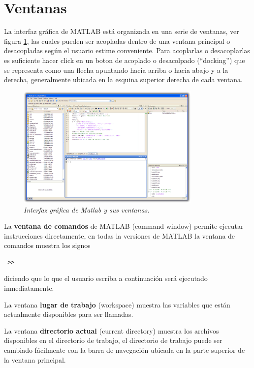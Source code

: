 \documentclass[11pt]{article}
\begin{document}
\section{Ventanas}

La interfaz gr\'afica de MATLAB est\'a organizada en una serie de ventanas, ver figura \ref{fig:interfaz}, 
las cuales pueden ser acopladas dentro de una ventana principal o desacopladas seg\'un el usuario estime conveniente. 
Para acoplarlas o desacoplarlas es suficiente hacer click en un boton de acoplado o desacolpado (``docking'') 
que se representa como una flecha apuntando hacia arriba o hacia abajo y a la derecha, generalmente ubicada en la esquina superior derecha de cada ventana.
\begin{figure}[htp]
\begin{center}
\includegraphics[width=0.8\textwidth]{./M2009desktop.png}
\caption{\sl Interfaz gr\'afica de Matlab y sus ventanas.}
\label{fig:interfaz}
\end{center}
\end{figure}

La \textbf{ventana de comandos} de MATLAB (command window) permite ejecutar instrucciones directamente, en todas la versiones de MATLAB la ventana de comandos muestra los signos 
\begin{verbatim}
 >>
\end{verbatim}
diciendo que lo que el usuario escriba a continuaci\'on ser\'a ejecutado 
inmediatamente. 

La ventana \textbf{lugar de trabajo} (workspace) muestra 
las variables que est\'an actualmente disponibles para ser llamadas. 

La ventana \textbf{directorio actual} (current directory) muestra los archivos 
disponibles en el directorio de trabajo, el directorio de trabajo puede ser cambiado f\'acilmente con la 
barra de navegaci\'on ubicada en la parte superior de la ventana principal.
\end{document}
